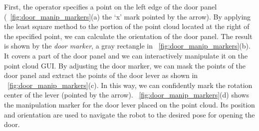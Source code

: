 First, the operator specifies a point on the left edge of the door panel
(\figurename~\ref{fig:door_manip_markers}(a) the `x' mark pointed by the arrow).
By applying the least square method to the portion of the point cloud located at the right of
the specified point, we can calculate the orientation of the door panel.
The result is shown by the {\it door marker}, a gray rectangle in
\figurename~\ref{fig:door_manip_markers}(b).
It covers a part of the door panel and we can interactively manipulate it on the point cloud GUI.
By adjusting the door marker, we can mask the points of the door panel and extract the points of
the door lever as shown in \figurename~\ref{fig:door_manip_markers}(c).
In this way, we can confidently mark the rotation center of the lever (pointed by the arrow).
\figurename~\ref{fig:door_manip_markers}(d) shows the manipulation marker for the door lever
placed on the point cloud.
Its position and orientation are used to navigate the robot to the desired pose for opening
the door.

